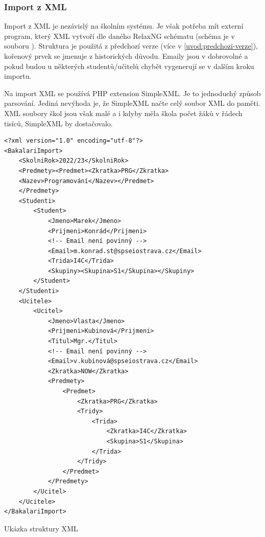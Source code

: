 \subsubsection{Import z XML}
Import z XML je nezávislý na školním systému. Je však potřeba mít externí program, který XML vytvoří dle daného RelaxNG schématu (schéma je v souboru ). Struktura je použitá z předchozí verze (více v \ref{uvod:predchozi-verze}), kořenový prvek se jmenuje  z historických důvodu. Emaily jsou v dobrovolné a pokud budou u některých studentů/učitelů chybět vygenerují se v dalším kroku importu.

Na import XML se používá PHP extension SimpleXML. Je to jednoduchý způsob parsování. Jediná nevýhoda je, že SimpleXML načte celý soubor XML do paměti. XML soubory škol jsou však malé a i kdyby měla škola počet žáků v řádech tisíců, SimpleXML by dostačovalo. 




\begin{code}[H]
  \begin{verbatim}
<?xml version="1.0" encoding="utf-8"?>
<BakalariImport>
    <SkolniRok>2022/23</SkolniRok>
    <Predmety><Predmet><Zkratka>PRG</Zkratka>
    <Nazev>Programování</Nazev></Predmet>
    </Predmety>
    <Studenti>
        <Student>
            <Jmeno>Marek</Jmeno>
            <Prijmeni>Konrád</Prijmeni>
            <!-- Email není povinný -->
            <Email>m.konrad.st@spseiostrava.cz</Email>
            <Trida>I4C</Trida>
            <Skupiny><Skupina>S1</Skupina></Skupiny>
        </Student>
    </Studenti>
    <Ucitele>
        <Ucitel>
            <Jmeno>Vlasta</Jmeno>
            <Prijmeni>Kubinová</Prijmeni>
            <Titul>Mgr.</Titul>
            <!-- Email není povinný -->
            <Email>v.kubinová@spseiostrava.cz</Email>
            <Zkratka>NOW</Zkratka>
            <Predmety>
                <Predmet>
                    <Zkratka>PRG</Zkratka>
                    <Tridy>
                        <Trida>
                            <Zkratka>I4C</Zkratka>
                            <Skupina>S1</Skupina>
                        </Trida>
                    </Tridy>
                </Predmet>
            </Predmety>
        </Ucitel>       
    </Ucitele>
</BakalariImport>
\end{verbatim}
\caption{Ukázka struktury XML}
\end{code}




